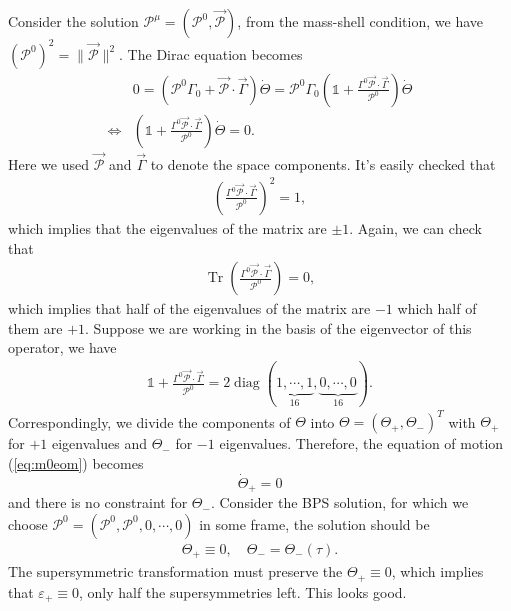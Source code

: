 \documentclass[graybox,envcountchap,sectrefs]{svmono}
\begin{document}
Consider the solution $\mathcal{P}^{\mu}=(\mathcal{P}^0,\vec{\mathcal{P}})$, from the mass-shell condition, we have $(\mathcal{P}^0)^2=\|\vec{\mathcal{P}}\|^2$. The Dirac equation becomes
\begin{align}
&0=(\mathcal{P}^0\Gamma_0+\vec{\mathcal{P}}\cdot \vec{\Gamma})\dot{\Theta}	
=\mathcal{P}^0\Gamma_0(\mathds{1}+\frac{\Gamma^0 \vec{\mathcal{P}}\cdot \vec{\Gamma}}{\mathcal{P}^0})\dot{\Theta}\nonumber\\
\Leftrightarrow &(\mathds{1}+\frac{\Gamma^0 \vec{\mathcal{P}}\cdot \vec{\Gamma}}{\mathcal{P}^0})\dot{\Theta}=0. \label{eq:m0eom}
\end{align}
Here we used $\vec{\mathcal{P}}$ and $\vec{\Gamma}$ to denote the space components.
It's easily checked that
\begin{align}
	\left(\frac{\Gamma^0 \vec{\mathcal{P}}\cdot \vec{\Gamma}}{\mathcal{P}^0}\right)^2=1,
\end{align}
which implies that the eigenvalues of the matrix are $\pm 1$. Again, we can check that
\begin{align}
	\operatorname{Tr}\left(\frac{\Gamma^0 \vec{\mathcal{P}}\cdot \vec{\Gamma}}{\mathcal{P}^0}\right)=0,
\end{align}
which implies that half of the eigenvalues of the matrix are $-1$ which half of them are $+1$.
Suppose we are working in the basis of the eigenvector of this operator, we have
\begin{align}
	\mathds{1}+\frac{\Gamma^0 \vec{\mathcal{P}}\cdot \vec{\Gamma}}{\mathcal{P}^0}=2\operatorname{diag}(\underbrace{1,\cdots,1}_{16},\underbrace{0,\cdots,0}_{16}).
\end{align}
Correspondingly, we divide the components of $\Theta$ into $\Theta=(\Theta_{+},\Theta_{-})^T$ with $\Theta_{+}$ for $+1$ eigenvalues and $\Theta_{-}$ for $-1$ eigenvalues.
Therefore, the equation of motion (\ref{eq:m0eom}) becomes
\begin{equation}
\dot{\Theta}_{+}=0	
\end{equation}
and there is no constraint for $\Theta_{-}$.
Consider the BPS solution, for which we choose $\mathcal{P}^0=(\mathcal{P}^0,\mathcal{P}^0,0,\cdots,0)$ in some frame, the solution should be
\begin{align}
\Theta_{+}\equiv 0,\quad
\Theta_{-}=\Theta_{-}(\tau).
\end{align}
The supersymmetric transformation must preserve the $\Theta_{+}\equiv 0$, which implies that $\varepsilon_{+}\equiv 0$, only half the supersymmetries left.
This looks good.
\end{document}
